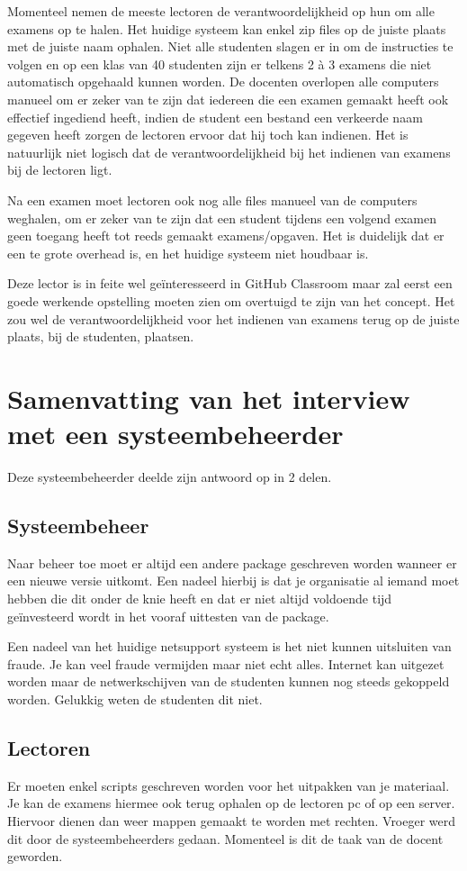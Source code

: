 Momenteel nemen de meeste lectoren de verantwoordelijkheid op hun om alle examens op te halen. Het huidige systeem kan enkel zip files op de juiste plaats met de juiste naam ophalen. Niet alle studenten slagen er in om de instructies te volgen en op een klas van 40 studenten zijn er telkens 2 à 3 examens die niet automatisch opgehaald kunnen worden. De docenten overlopen alle computers manueel om er zeker van te zijn dat iedereen die een examen gemaakt heeft ook effectief ingediend heeft, indien de student een bestand een verkeerde naam gegeven heeft zorgen de lectoren ervoor dat hij toch kan indienen. Het is natuurlijk niet logisch dat de verantwoordelijkheid bij het indienen van examens bij de lectoren ligt.

Na een examen moet lectoren ook nog alle files manueel van de computers weghalen, om er zeker van te zijn dat een student tijdens een volgend examen geen toegang heeft tot reeds gemaakt examens/opgaven. Het is duidelijk dat er een te grote overhead is, en het huidige systeem niet houdbaar is.

Deze lector is in feite wel geïnteresseerd in GitHub Classroom maar zal eerst een goede werkende opstelling moeten zien om overtuigd te zijn van het concept. Het zou wel de verantwoordelijkheid voor het indienen van examens terug op de juiste plaats, bij de studenten, plaatsen. \newpage

\section{Samenvatting van het interview met een systeembeheerder}

Deze systeembeheerder deelde zijn antwoord op in 2 delen. 
\subsection{Systeembeheer}

Naar beheer toe moet er altijd een andere package  geschreven worden wanneer er een nieuwe versie uitkomt. Een nadeel hierbij is dat je organisatie al iemand moet hebben die dit onder de knie heeft en dat er niet altijd voldoende tijd geïnvesteerd wordt in het vooraf uittesten van de package.

Een nadeel van het huidige netsupport systeem is het niet kunnen uitsluiten van fraude. Je kan veel fraude vermijden maar niet echt alles. Internet kan uitgezet worden maar de netwerkschijven van de studenten kunnen nog steeds gekoppeld worden. Gelukkig weten de studenten dit niet.

\subsection{Lectoren}

Er moeten enkel scripts geschreven worden voor het uitpakken van je materiaal. Je kan de examens hiermee ook terug ophalen op de lectoren pc of op een server. Hiervoor dienen dan weer mappen gemaakt te worden met rechten. Vroeger werd dit door de systeembeheerders gedaan. Momenteel is dit de taak van de docent geworden.